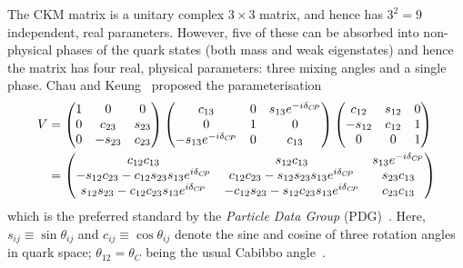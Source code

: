The CKM matrix is a unitary complex $3\times3$ matrix, and hence has $3^2=9$ independent, real parameters. However, five of these can be absorbed into non-physical phases of the quark states (both mass and weak eigenstates) and hence the matrix has four real, physical parameters: three mixing angles and a single phase. Chau and Keung~\cite{chauCommentsParametrizationKobayashiMaskawa1984} proposed the parameterisation
\begin{align}
\begin{split}\label{eq:CK_CKM_matrix}
        V &= 
        \begin{pmatrix}
            1 & 0 & 0 \\ 0 & c_{23} & s_{23} \\ 0 & -s_{23} & c_{23}
        \end{pmatrix}
        \begin{pmatrix}
            c_{13} & 0 & s_{13}e^{-i\delta_{{C\!P}}} \\ 0 & 1 & 0 \\ -s_{13}e^{-i\delta_{{C\!P}}} & 0 & c_{13}
        \end{pmatrix}
        \begin{pmatrix}
            c_{12} & s_{12}  & 0 \\ -s_{12} & c_{12} & 1 \\ 0 & 0 & 1
        \end{pmatrix}
        \\
        &=
        \begin{pmatrix}
            c_{12}c_{13} & s_{12}c_{13} & s_{13}e^{-i\delta_{{C\!P}}} \\
            -s_{12}c_{23}-c_{12}s_{23}s_{13}e^{i\delta_{{C\!P}}} &
            c_{12}c_{23}-s_{12}s_{23}s_{13}e^{i\delta_{{C\!P}}} &
            s_{23}c_{13} \\
            s_{12}s_{23}-c_{12}c_{23}s_{13}e^{i\delta_{{C\!P}}} &
            -c_{12}s_{23}-s_{12}c_{23}s_{13}e^{i\delta_{{C\!P}}} &
            c_{23}c_{13} \\
        \end{pmatrix}
\end{split}
\end{align}
which is the preferred standard by the \emph{Particle Data Group} (PDG)~\cite{PDG2020}. Here, $s_{ij}\equiv\sin \theta_{ij}$ and $c_{ij}\equiv\cos \theta_{ij}$ denote the sine and cosine of three rotation angles in quark space; $\theta_{12}=\theta_C$ being the usual Cabibbo angle~\cite{cabibboUnitarySymmetryLeptonic1963}.

